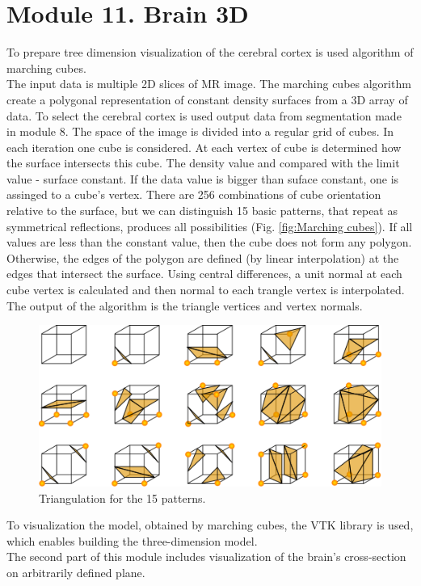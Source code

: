 \section{Module 11. Brain 3D}

\indent To prepare tree dimension visualization of the cerebral cortex
is used algorithm of marching cubes.\\
 \indent The input data is multiple 2D slices of MR image. The marching
cubes algorithm create a polygonal representation of constant density
surfaces from a 3D array of data. To select the cerebral cortex is
used output data from segmentation made in module 8. The space of
the image is divided into a regular grid of cubes. In each iteration
one cube is considered. At each vertex of cube is determined how the
surface intersects this cube. The density value and compared with
the limit value - surface constant. If the data value is bigger than
suface constant, one is assinged to a cube's vertex. There are 256
combinations of cube orientation relative to the surface, but we can
distinguish 15 basic patterns, that repeat as symmetrical reflections,
produces all possibilities (Fig. \ref{fig:Marching cubes}). If all
values \LyXZeroWidthSpace \LyXZeroWidthSpace are less than the constant
value, then the cube does not form any polygon. Otherwise, the edges
of the polygon are defined (by linear interpolation) at the edges
that intersect the surface. Using central differences, a unit normal
at each cube vertex is calculated and then normal to each trangle
vertex is interpolated. The output of the algorithm is the triangle
vertices and vertex normals.

\begin{figure}[H]
\centering{}\includegraphics[scale=0.7]{figures/MarchingCubes}\caption{Triangulation for the 15 patterns. \label{fig:figures/Marching cubes}}
\end{figure}

\indent To visualization the model, obtained by marching cubes, the
VTK library is used, which enables building the three-dimension model.
\\
 \indent The second part of this module includes visualization of
the brain's cross-section on arbitrarily defined plane. \\
 \indent

